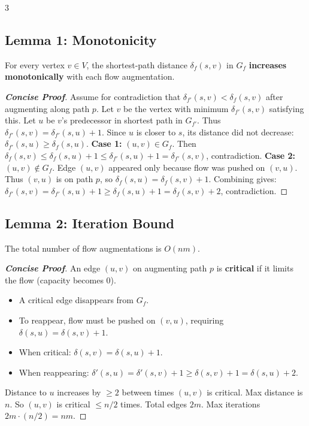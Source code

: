 \documentclass[a4paper,10pt]{article}
\begin{document}
\begin{multicols}{3}
\subsection{Lemma 1: Monotonicity}
For every vertex $v \in V$, the shortest-path distance $\delta_f(s, v)$ in $G_f$ \textbf{increases monotonically} with each flow augmentation.
\begin{proof}[\textbf{Concise Proof}]
Assume for contradiction that $\delta_{f'}(s, v) < \delta_f(s, v)$ after augmenting along path $p$. Let $v$ be the vertex with minimum $\delta_{f'}(s, v)$ satisfying this.
Let $u$ be $v$'s predecessor in shortest path in $G_{f'}$. Thus $\delta_{f'}(s, v) = \delta_{f'}(s, u) + 1$.
Since $u$ is closer to $s$, its distance did not decrease: $\delta_{f'}(s, u) \ge \delta_f(s, u)$.
\textbf{Case 1:} $(u,v) \in G_f$. Then $\delta_f(s, v) \le \delta_f(s, u) + 1 \le \delta_{f'}(s, u) + 1 = \delta_{f'}(s, v)$, contradiction.
\textbf{Case 2:} $(u,v) \notin G_f$. Edge $(u,v)$ appeared only because flow was pushed on $(v,u)$. Thus $(v,u)$ is on path $p$, so $\delta_f(s, u) = \delta_f(s, v) + 1$.
Combining gives: $\delta_{f'}(s, v) = \delta_{f'}(s, u) + 1 \ge \delta_f(s, u) + 1 = \delta_f(s, v) + 2$, contradiction.
\end{proof}

\subsection{Lemma 2: Iteration Bound}
The total number of flow augmentations is $O(nm)$.
\begin{proof}[\textbf{Concise Proof}]
An edge $(u,v)$ on augmenting path $p$ is \textbf{critical} if it limits the flow (capacity becomes 0).
\begin{itemize}
    \item A critical edge disappears from $G_f$.
    \item To reappear, flow must be pushed on $(v,u)$, requiring $\delta(s, u) = \delta(s, v) + 1$.
    \item When critical: $\delta(s, v) = \delta(s, u) + 1$.
    \item When reappearing: $\delta'(s, u) = \delta'(s, v) + 1 \ge \delta(s, v) + 1 = \delta(s, u) + 2$.
\end{itemize}
Distance to $u$ increases by $\ge 2$ between times $(u,v)$ is critical. Max distance is $n$. So $(u,v)$ is critical $\le n/2$ times.
Total edges $2m$. Max iterations $2m \cdot (n/2) = nm$.
\end{proof}


\end{multicols}
\end{document}
